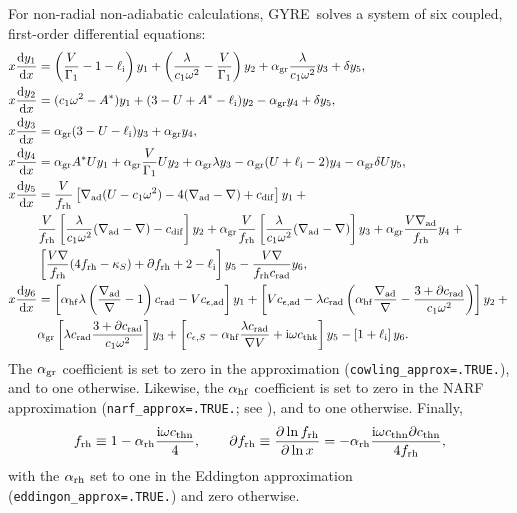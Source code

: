 \documentclass[fleqn]{article}
\newcommand{\gyre}{GYRE}
\newcommand{\diff}{\mathrm{d}}
\newcommand{\ii}{\mathrm{i}}
\newcommand{\elli}{\ell_{\rm i}}
\newcommand{\Vg}{\frac{V}{\Gamma_{1}}}
\newcommand{\As}{A^{\ast}}
\newcommand{\nabad}{\nabla_{\rm ad}}
\newcommand{\kapS}{\kappa_{S}}
\newcommand{\crad}{c_{\rm rad}}
\newcommand{\dcrad}{\partial\crad}
\newcommand{\cepsad}{c_{\epsilon,{\rm ad}}}
\newcommand{\cepsS}{c_{\epsilon,S}}
\newcommand{\cdif}{c_{\rm dif}}
\newcommand{\cthn}{c_{\rm thn}}
\newcommand{\dcthn}{\partial\cthn}
\newcommand{\cthk}{c_{\rm thk}}
\newcommand{\agr}{\alpha_{\rm gr}}
\newcommand{\ahf}{\alpha_{\rm hf}}
\newcommand{\arh}{\alpha_{\rm rh}}
\newcommand{\frh}{f_{\rm rh}}
\newcommand{\dfrh}{\partial f_{\rm rh}}
\begin{document}
For non-radial non-adiabatic calculations, \gyre\ solves a system of
six coupled, first-order differential equations:
\begin{align*}
x \frac{\diff y_{1}}{\diff x} &=
\left(\Vg - 1 - \elli \right) y_{1} +
\left(\frac{\lambda}{c_{1} \omega^{2}} - \Vg \right) y_{2} +
\agr \frac{\lambda}{c_{1} \omega^{2}} y_{3} +
\delta y_{5}, \\
x \frac{\diff y_{2}}{\diff x} &=
(c_{1} \omega^{2} - \As ) y_{1} +
(3 - U + \As - \elli) y_{2} -
\agr y_{4} +
\delta y_{5}, \\
x \frac{\diff y_{3}}{\diff x} &=
\agr (3 - U - \elli) y_{3} +
\agr y_{4}, \\
x \frac{\diff y_{4}}{\diff x} &=
\agr \As U y_{1} +
\agr \Vg U y_{2} +
\agr \lambda y_{3} -
\agr (U + \elli - 2) y_{4}
- \agr \delta U y_{5}, \\
x \frac{\diff y_{5}}{\diff x} &=
\frac{V}{\frh} \left[ \nabad (U - c_{1}\omega^{2}) - 4 (\nabad - \nabla) + \cdif \right] y_{1} + \mbox{} \\
&
\frac{V}{\frh} \left[ \frac{\lambda}{c_{1} \omega^{2}} (\nabad - \nabla) - \cdif \right] y_{2} +
\agr \frac{V}{\frh} \left[ \frac{\lambda}{c_{1} \omega^{2}} (\nabad - \nabla) \right] y_{3} + \agr \frac{V \nabad}{\frh} y_{4} + \mbox{} \\
& 
\left[ \frac{V \nabla}{\frh} (4 \frh - \kapS) + \dfrh + 2 - \elli \right] y_{5} -
\frac{V \nabla}{\frh \crad} y_{6}, \\
x \frac{\diff y_{6}}{\diff x} &=
\left[ \ahf \lambda\left( \frac{\nabad}{\nabla} - 1 \right) \crad - V \cepsad \right] y_{1} +
\left[ V \cepsad - \lambda \crad \left( \ahf \frac{\nabad}{\nabla} - \frac{3 + \dcrad}{c_{1}\omega^{2}} \right) \right] y_{2} + \mbox{} \\
&
\agr \left[ \lambda \crad \frac{3 + \dcrad}{c_{1}\omega^{2}} \right] y_{3} +
\left[ \cepsS - \ahf \frac{\lambda\crad}{\nabla V} + \ii \omega \cthk\right] y_{5} -
\left[ 1 + \elli \right] y_{6}.
\end{align*}
The $\agr$ coefficient is set to zero in the \citet{Cowling:1941aa}
approximation (\texttt{cowling\_approx=.TRUE.}), and to one
otherwise. Likewise, the $\ahf$ coefficient is set to zero in the NARF
approximation (\texttt{narf\_approx=.TRUE.}; see
\citealp{Townsend:2005ab}), and to one otherwise. Finally,
\begin{equation}
  \frh \equiv 1 - \arh \frac{\ii \omega \cthn}{4}, \qquad \dfrh \equiv \frac{\partial \ln \frh}{\partial \ln x} = - \arh \frac{\ii \omega \cthn \dcthn}{4 \frh},
\end{equation}
with the $\arh$ set to one in the Eddington approximation
(\texttt{eddingon\_approx=.TRUE.}) and zero otherwise.
\end{document}
